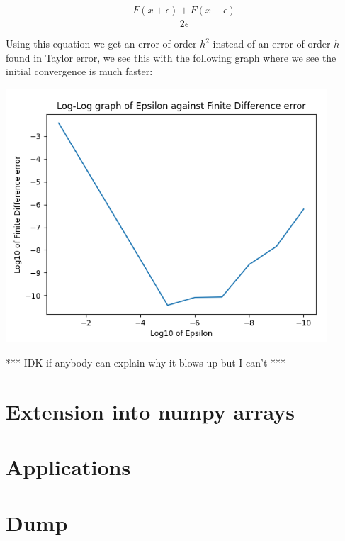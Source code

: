 \documentclass{article}
\begin{document}
\begin{equation}
    \frac{F(x + \epsilon) + F(x - \epsilon)}{2 \epsilon}
\end{equation}

Using this equation we get an error of order $h^2$ instead of an error of order $h$ found in Taylor error, we see this with the following graph where we see the initial convergence is much faster:

\begin{center}
    \includegraphics[width=12cm]{images/Finite_Difference_error_1.png}
\end{center}

*** IDK if anybody can explain why it blows up but I can't ***

\section{Extension into numpy arrays}

\section{Applications}




\section{Dump}
\end{document}
